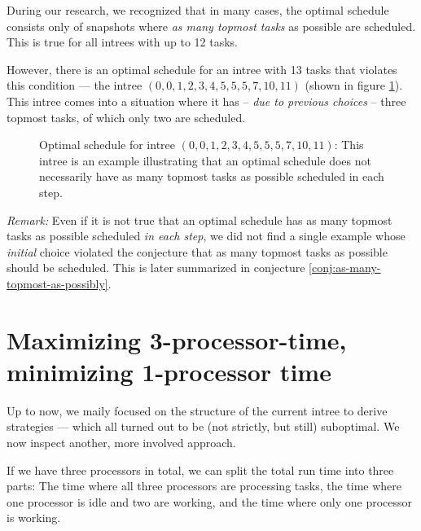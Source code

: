 During our research, we recognized that in many cases, the optimal schedule consists only of snapshots where \emph{as many topmost tasks} as possible are scheduled. This is true for all intrees with up to 12 tasks.

However, there is an optimal schedule for an intree with 13 tasks that violates this condition ---  the intree $(0,0,1,2,3,4,5,5,5,7,10,11)$ (shown in figure \ref{fig:as-many-topmost-tasks-as-possible-false}). This intree comes into a situation where it has -- \emph{due to previous choices} -- three topmost tasks, of which only two are scheduled.

\begin{figure}[th]
  \centering
  
  \caption{Optimal schedule for intree $(0,0,1,2,3,4,5,5,5,7,10,11)$: This intree is an example illustrating that an optimal schedule does not necessarily have as many topmost tasks as possible scheduled in each step.}
  \label{fig:as-many-topmost-tasks-as-possible-false}
\end{figure}

\emph{Remark:} Even if it is not true that an optimal schedule has as many topmost tasks as possible scheduled \emph{in each step}, we did not find a single example whose \emph{initial} choice violated the conjecture that as many topmost tasks as possible should be scheduled. This is later summarized in conjecture \ref{conj:as-many-topmost-as-possibly}.

\section{Maximizing 3-processor-time, minimizing 1-processor time}
\label{sec:p3-disproving-long-p3-and-short-p1-time}

Up to now, we maily focused on the structure of the current intree to derive strategies --- which all turned out to be (not strictly, but still) suboptimal. We now inspect another, more involved approach.

If we have three processors in total, we can split the total run time into three parts: The time where all three processors are processing tasks, the time where one processor is idle and two are working, and the time where only one processor is working.


